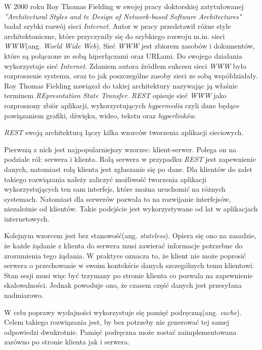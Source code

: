 

W 2000 roku Roy Thomas Fielding w swojej pracy doktorskiej zatytułowanej \textsl{''Architectural Styles and te Design of Network-based Software Architectures"} badał szybki rozwój sieci \textsl{Internet}. Autor w pracy przedstawił różne style architektoniczne, które przyczyniły się do szybkiego rozwoju m.in. sieci \textsl{WWW}(ang. \textsl{World Wide Web}). Sieć \textsl{WWW} jest zbiorem zasobów i dokumentów, które są połączone ze sobą hiperłączami oraz URLami. Do swojego działania wykorzystuje sieć \textsl{Internet}.  Zdaniem autora źródłem sukcesu sieci \textsl{WWW} było rozproszenie systemu, oraz to jak poszczególne zasoby sieci ze sobą współdziałały\cite{restinpractice}. Roy Thomas Fielding nawiązał do takiej architektury nazywając ją właśnie terminem \textsl{REpresntation State Transfer}. \textsl{REST} opisuje sieć \textsl{WWW} jako rozproszony zbiór aplikacji, wykorzystujących \textsl{hypermedia} czyli dane będące powiązaniem grafiki, dźwięku, wideo, tekstu oraz \textsl{hyperlinków}. 

\textsl{REST} swoją architekturą łączy kilka wzorców tworzenia aplikacji sieciowych. 

Pierwszą z nich jest najpopularniejszy wzorzec: klient-serwer. Polega on na podziale ról: serwera i klienta. Rolą serwera w przypadku \textsl{REST} jest zapewnienie danych, natomiast rolą klienta jest zgłaszanie się po dane. Dla klientów do zalet takiego rozwiązania należy zaliczyć możliwość tworzenia aplikacji wykorzystujących ten sam interfejs, które można uruchomić na różnych systemach. Natomiast dla serwerów pozwala to na rozwijanie interfejsów, niezależnie od klientów. Takie podejście jest wykorzystywane od lat w aplikacjach internetowych. 

Kolejnym wzorcem jest bez stanowość(ang. \textsl{stateless}). Opiera się ono na zasadzie, że każde żądanie z klienta do serwera musi zawierać informacje potrzebne do zrozumienia tego żądania. W praktyce oznacza to, że klient nie może poprosić serwera o przechowanie w swoim kontekście danych szczególnych temu klientowi. Stan sesji musi więc być trzymany po stronie klienta co pozwala na zapewnienie skalowalności. Jednak powoduje ono, że czasem część danych jest przesyłana nadmiarowo.

W celu poprawy wydajności wykorzystuje się pamięć podręczną(ang. \textsl{cache}). Celem takiego rozwiązania jest, by bez potrzeby nie generować tej samej odpowiedzi dwukrotnie. Pamięć podręczna może zostać zaimplementowana zarówno po stronie klienta jak i serwera.

